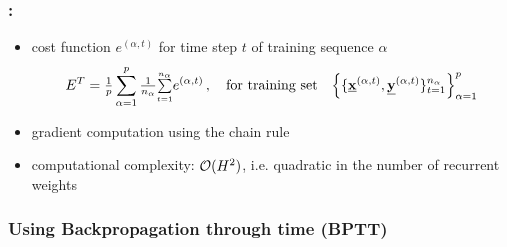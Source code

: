 \begin{frame}\frametitle{\subsecname: \subsubsecname}
	\begin{itemize}
		\item<1-> cost function $e^{(\alpha,t)}$ for time 
				step $t$ of training sequence $\alpha$ 
			\vspace{-1mm}
			$$
				E^T = {\textstyle \frac{1}{p}} \sum\limits_{\alpha=1}^p
				{\textstyle \frac{1}{n_\alpha}}{\textstyle \sum\limits_{\scriptscriptstyle t=1}^{\scriptscriptstyle n_\alpha}} e^{(\alpha,t)} \,,
				\quad \text{for training set} \quad 
				\Big\{ \{ \underline{\mathbf{x}}^{(\alpha,t)}, \underline{\mathbf{y}}^{(\alpha,t)} 
					\}_{t=1}^{n_\alpha}\Big\}_{\alpha=1}^{p}
			$$
		\vspace{-1mm}
		\item<2-> gradient computation using the chain rule%
		\vspace{1mm}
		\item<2-> computational complexity: $\mathcal{O}(H^2)$, i.e. quadratic in the number of recurrent weights
	\end{itemize}
	\vspace{-2mm}
\end{frame}


\subsubsection{Using Backpropagation through time (BPTT)}


